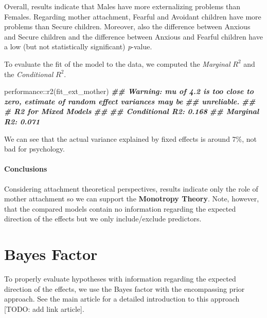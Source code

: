 \documentclass[
]{book}
\newenvironment{Shaded}{\begin{snugshade}}{\end{snugshade}}
\newcommand{\DocumentationTok}[1]{\textcolor[rgb]{0.56,0.35,0.01}{\textbf{\textit{#1}}}}
\newcommand{\FunctionTok}[1]{\textcolor[rgb]{0.00,0.00,0.00}{#1}}
\newcommand{\NormalTok}[1]{#1}
\newcommand{\SpecialCharTok}[1]{\textcolor[rgb]{0.00,0.00,0.00}{#1}}
\begin{document}
Overall, results indicate that Males have more externalizing problems than Females. Regarding mother attachment, Fearful and Avoidant children have more problems than Secure children. Moreover, also the difference between Anxious and Secure children and the difference between Anxious and Fearful children have a low (but not statistically significant) \emph{p}-value.

To evaluate the fit of the model to the data, we computed the \emph{Marginal} \(R^2\) and the \emph{Conditional} \(R^2\).

\begin{Shaded}
\begin{Highlighting}[]
\NormalTok{performance}\SpecialCharTok{::}\FunctionTok{r2}\NormalTok{(fit\_ext\_mother)}
\DocumentationTok{\#\# Warning: mu of 4.2 is too close to zero, estimate of random effect variances may be}
\DocumentationTok{\#\#   unreliable.}
\DocumentationTok{\#\# \# R2 for Mixed Models}
\DocumentationTok{\#\# }
\DocumentationTok{\#\#   Conditional R2: 0.168}
\DocumentationTok{\#\#      Marginal R2: 0.071}
\end{Highlighting}
\end{Shaded}

We can see that the actual variance explained by fixed effects is around 7\%, not bad for psychology.

\hypertarget{conclusions-1}{%
\subsubsection*{Conclusions}\label{conclusions-1}}

Considering attachment theoretical perspectives, results indicate only the role of mother attachment so we can support the \textbf{Monotropy Theory}. Note, however, that the compared models contain no information regarding the expected direction of the effects but we only include/exclude predictors.

\hypertarget{BF-ext}{%
\chapter{Bayes Factor}\label{BF-ext}}

To properly evaluate hypotheses with information regarding the expected direction of the effects, we use the Bayes factor with the encompassing prior approach. See the main article for a detailed introduction to this approach {[}TODO: add link article{]}.
\end{document}
